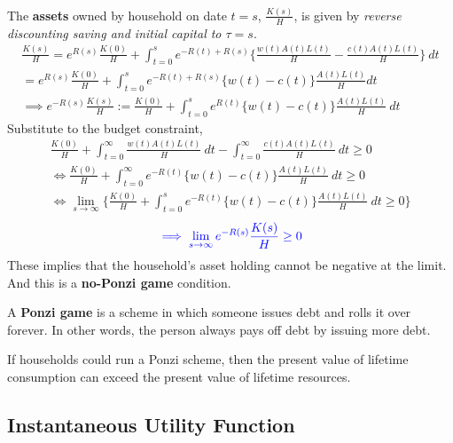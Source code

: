 \documentclass[]{article}
\begin{document}
	\\
	The \textbf{assets} owned by household on date $t=s$, $\frac{K(s)}{H}$, is given by \emph{reverse discounting saving and initial capital to $\tau=s$}.
	\begin{gather*}
		\frac{K(s)}{H} = e^{R(s)} \frac{K(0)}{H} + \int_{t=0}^s e^{-R(t)+R(s)} \Big\{\frac{w(t)A(t)L(t)}{H} - \frac{c(t)A(t)L(t)}{H} \Big\}\ dt \\
		= e^{R(s)} \frac{K(0)}{H} +  \int_{t=0}^s e^{-R(t)+R(s)} \{w(t) - c(t)\} \frac{A(t)L(t)}{H} dt \\
		\implies e^{-R(s)} \frac{K(s)}{H} := \frac{K(0)}{H} + \int_{t=0}^s e^{R(t)} \{w(t) - c(t)\} \frac{A(t)L(t)}{H}\ dt
	\end{gather*}
	Substitute to the budget constraint,
	\begin{gather*}
		\frac{K(0)}{H} + \int_{t=0}^\infty \frac{w(t)A(t)L(t)}{H}\ dt - \int_{t=0}^\infty \frac{c(t)A(t)L(t)}{H}\ dt \geq 0 \\
		\iff \frac{K(0)}{H} + \int_{t=0}^\infty e^{-R(t)} \{w(t) - c(t)\} \frac{A(t)L(t)}{H}\ dt \geq 0 \\
		\iff \lim_{s \to \infty}\Big\{ \frac{K(0)}{H} + \int_{t=0}^s e^{-R(t)} \{w(t) - c(t)\} \frac{A(t)L(t)}{H}\ dt \geq 0 \Big \}
	\end{gather*}
	\begin{equation}
		\textcolor{blue}{
			\implies \lim_{s\to \infty}e^{-R(s)}\frac{K(s)}{H} \geq 0
		}
	\end{equation}
	These implies that the household's asset holding cannot be negative at the limit. And this is a \textbf{no-Ponzi game} condition.
	
	\begin{definition}
		A \textbf{Ponzi game} is a scheme in which someone issues debt and rolls it over forever. In other words, the person always pays off debt by issuing more debt.
	\end{definition}
	
	\begin{remark}
		If households could run a Ponzi scheme, then the present value of lifetime consumption can exceed the present value of lifetime resources.
	\end{remark}
	
	\subsection{Instantaneous Utility Function}
	
\end{document}
